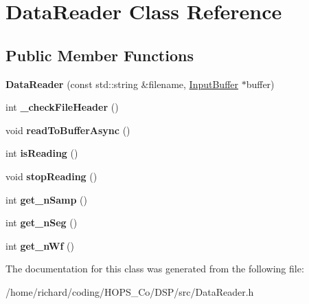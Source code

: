 \hypertarget{classDataReader}{\section{Data\-Reader Class Reference}
\label{classDataReader}
}
\subsection*{Public Member Functions}
\begin{DoxyCompactItemize}
\item 
\hypertarget{classDataReader_adba9892886eceb717d50ffc02bf8e2c2}{{\bfseries Data\-Reader} (const std\-::string \&filename, \hyperlink{classRingbuffer}{Input\-Buffer} $\ast$buffer)}\label{classDataReader_adba9892886eceb717d50ffc02bf8e2c2}

\item 
\hypertarget{classDataReader_aa53ed71dd3a6220e8f6d7d3f3db31ade}{int {\bfseries \-\_\-check\-File\-Header} ()}\label{classDataReader_aa53ed71dd3a6220e8f6d7d3f3db31ade}

\item 
\hypertarget{classDataReader_ae657eb3b65c75418f21ba9f03ac12b13}{void {\bfseries read\-To\-Buffer\-Async} ()}\label{classDataReader_ae657eb3b65c75418f21ba9f03ac12b13}

\item 
\hypertarget{classDataReader_a8a5bf454b34839d63e5d0c6ca7573682}{int {\bfseries is\-Reading} ()}\label{classDataReader_a8a5bf454b34839d63e5d0c6ca7573682}

\item 
\hypertarget{classDataReader_a4d153d457d8121a14386050a5a5618ce}{void {\bfseries stop\-Reading} ()}\label{classDataReader_a4d153d457d8121a14386050a5a5618ce}

\item 
\hypertarget{classDataReader_a8ada95ad5aca5fbb3e50f0b6a954a623}{int {\bfseries get\-\_\-n\-Samp} ()}\label{classDataReader_a8ada95ad5aca5fbb3e50f0b6a954a623}

\item 
\hypertarget{classDataReader_a94f681f6c77c9ad57c09b26fc367084b}{int {\bfseries get\-\_\-n\-Seg} ()}\label{classDataReader_a94f681f6c77c9ad57c09b26fc367084b}

\item 
\hypertarget{classDataReader_ad754d5ff3d2e833aaabf9460f47a77e4}{int {\bfseries get\-\_\-n\-Wf} ()}\label{classDataReader_ad754d5ff3d2e833aaabf9460f47a77e4}

\end{DoxyCompactItemize}


The documentation for this class was generated from the following file\-:\begin{DoxyCompactItemize}
\item 
/home/richard/coding/\-H\-O\-P\-S\-\_\-\-Co/\-D\-S\-P/src/Data\-Reader.\-h\end{DoxyCompactItemize}
